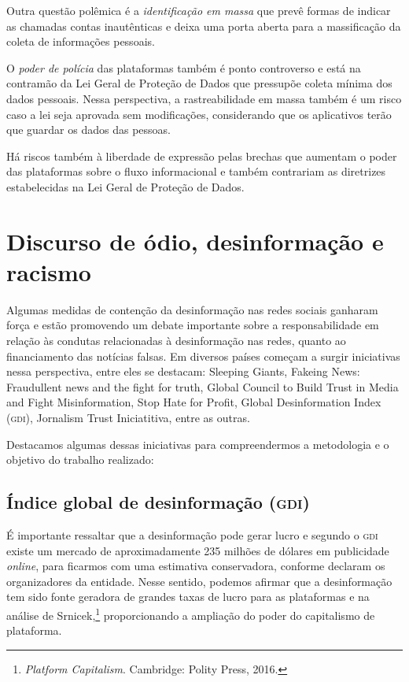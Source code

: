 Outra questão polêmica é a \textit{identificação em massa} que prevê formas de indicar as chamadas contas inautênticas e deixa uma porta aberta para a massificação da coleta de informações pessoais.

O \textit{poder de polícia} das plataformas também é ponto controverso e está na contramão da Lei Geral de Proteção de Dados que pressupõe coleta mínima dos dados pessoais. Nessa perspectiva, a rastreabilidade em massa também é um risco caso a lei seja aprovada sem modificações, considerando que os aplicativos terão que guardar os dados das pessoas.

Há riscos também à liberdade de expressão pelas brechas que aumentam o poder das plataformas sobre o fluxo informacional e também contrariam as diretrizes estabelecidas na Lei Geral de Proteção de Dados.

\section{Discurso de ódio, desinformação e racismo}

Algumas medidas de contenção da desinformação nas redes sociais ganharam
força e estão promovendo um debate importante sobre a responsabilidade
em relação às condutas relacionadas à desinformação nas redes, quanto ao
financiamento das notícias falsas. Em diversos países começam a surgir
iniciativas nessa perspectiva, entre eles se destacam: Sleeping Giants,
Fakeing News: Fraudullent news and the fight for truth, Global Council
to Build Trust in Media and Fight Misinformation, Stop Hate for Profit, Global Desinformation Index (\textsc{gdi}), Jornalism Trust Iniciatitiva, entre
as outras.

Destacamos algumas dessas iniciativas para compreendermos a metodologia
e o objetivo do trabalho realizado:

\subsection{Índice global de desinformação (\textsc{gdi})}

É importante ressaltar que a desinformação pode gerar lucro e segundo o
\textsc{gdi} existe um mercado de
aproximadamente 235 milhões de dólares em publicidade \textit{online}, para ficarmos
com uma estimativa conservadora, conforme declaram os organizadores da
entidade. Nesse sentido, podemos afirmar que a desinformação tem sido
fonte geradora de grandes taxas de lucro para as plataformas e na
análise de Srnicek,\footnote{\textit{Platform Capitalism}. Cambridge: Polity Press, 2016.} proporcionando a ampliação do poder do capitalismo de plataforma.

